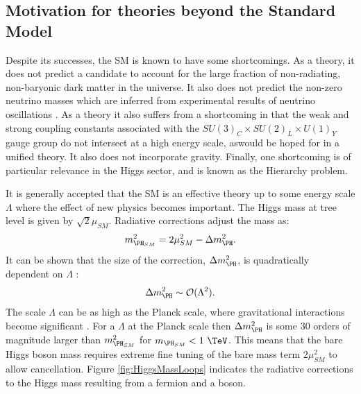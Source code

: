 \subsection{Motivation for theories beyond the Standard Model}
\label{sec:hierarchyproblem}

Despite its successes, the \ac{SM} is known to have some shortcomings. As a
theory, it does not predict a candidate to account for the large fraction of
non-radiating, non-baryonic dark matter in the universe. It also does not
predict the non-zero neutrino masses which are inferred from experimental
results of neutrino oscillations \cite{PDG}. As a theory it also suffers from a
shortcoming in that the weak and strong coupling constants associated with the
$SU(3)_{C} \times SU(2)_{L} \times U(1)_{Y}$ gauge group do not intersect at a
high energy scale, aswould be hoped for in a unified theory. It also does not
incorporate gravity. Finally, one shortcoming is of particular relevance 
in the Higgs sector, and is known as the Hierarchy problem.

It is generally accepted that the \ac{SM} is an effective theory up to some
energy scale $\Lambda$ where the effect of new physics becomes important. 
The Higgs mass at tree level is given by $\sqrt{2}\mu_{SM}$. Radiative
corrections adjust the mass as:
\begin{equation}
m_{\PH_{SM}}^{2} = 2\mu_{SM}^{2} - \Delta m_{\PH}^{2}. 
\end{equation}
It can be shown that the size of the correction, $\Delta m_{\PH}^{2}$, is
quadratically dependent on $\Lambda$ \cite{Carena:2002es}:
\begin{equation}
\Delta m_{\PH}^{2} \sim \mathcal{O}(\Lambda^{2}).
\end{equation}
The scale $\Lambda$ can be as high as the Planck scale, where gravitational
interactions become significant \cite{Griffiths:2008nx}. For a $\Lambda$ at the Planck scale then
$\Delta m_{\PH}^{2}$ is some 30 orders of magnitude larger than 
$m_{\PH_{SM}}^{2}$ for $m_{\PH_{SM}}<1~\TeV$. This means that the bare Higgs
boson mass requires extreme fine tuning of the bare mass term $2\mu_{SM}^{2}$ to
allow cancellation. Figure \ref{fig:HiggsMassLoops} indicates the radiative
corrections to the Higgs mass resulting from a fermion and a boson.

